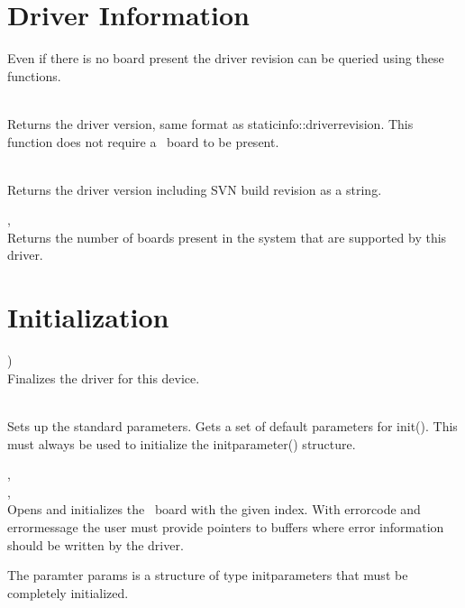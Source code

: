 \section{Driver Information}

	Even if there is no board present the driver revision can be queried using these functions.

	\\
	Returns the driver version, same format as \textsf{\prefix static\tu info::driver\tu revision}. 
	This function does not require a \deviceName\ board to be present.

	\\
	Returns the driver version including SVN build revision as a string. 

	, \\
	\label{countdevices}
	Returns the number of boards present in the system that are supported by this driver.\par


\section {Initialization}

		\device )\\
		Finalizes the driver for this device.


	

		\\
		Sets up the standard parameters. Gets a set of default parameters for \textsf{\prefix init()}. This must always be used to initialize the \textsf{\prefix init\tu parameter()} structure.\par

		, \\ 
		, \\
		Opens and initializes the \deviceName\ board with the given index. 
		With \textsf{error\tu code} and \textsf{error\tu message} the user must provide pointers to buffers where error information should be written by the driver.\par

		The paramter \textsf{params} is a structure of type \textsf{\prefix init\tu parameters} that must be completely initialized.\par

